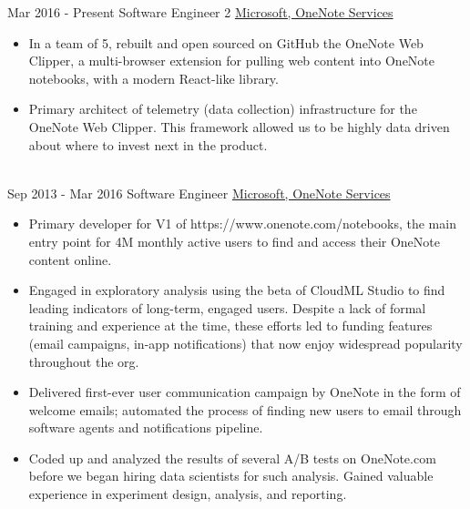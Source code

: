 \documentclass[letterpaper]{twentysecondcv} %
\begin{document}
\begin{twenty} %
\twentyitem
    	{Mar 2016 -}
		{Present}
        {Software Engineer 2}
        {\href{http://www.onenote.com/}{Microsoft, OneNote Services}}
        {}
        {
        {\begin{itemize}
        \item In a team of 5, rebuilt and open sourced on GitHub the OneNote Web Clipper, a multi-browser extension for pulling web content into OneNote notebooks, with a modern React-like library.
        \item Primary architect of telemetry (data collection) infrastructure for the OneNote Web Clipper. This framework allowed us to be highly data driven about where to invest next in the product.
    \end{itemize}}
        }
    \\
	\twentyitem
    	{Sep 2013 -}
		{Mar 2016}
        {Software Engineer}
        {\href{http://www.onenote.com/}{Microsoft, OneNote Services}}
        {}
        {
        {\begin{itemize}
        \item Primary developer for V1 of https://www.onenote.com/notebooks, the main entry point for 4M monthly active users to find and access their OneNote content online.
        \item Engaged in exploratory analysis using the beta of CloudML Studio to find leading indicators of long-term, engaged users. Despite a lack of formal training and experience at the time, these efforts led to funding features (email campaigns, in-app notifications) that now enjoy widespread popularity throughout the org.
        \item Delivered first-ever user communication campaign by OneNote in the form of welcome emails; automated the process of finding new users to email through software agents and notifications pipeline.
        \item Coded up and analyzed the results of several A/B tests on OneNote.com before we began hiring data scientists for such analysis. Gained valuable experience in experiment design, analysis, and reporting.
    \end{itemize}}
        }

\end{twenty}

\end{document}
